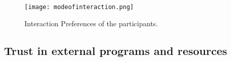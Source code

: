 



\begin{figure}[htp]
\centerline{\texttt{[image: modeofinteraction.png]}}
\caption{Interaction Preferences of the participants.}
\label{fig:fig}
\end{figure}

\subsection{Trust in external programs and resources}

